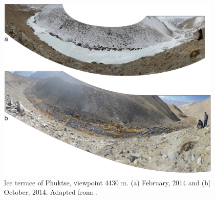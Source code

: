\begin{figure}[htb]
	\centering
	\includegraphics[width=\textwidth]{figs/IT_example.png}
	\caption{Ice terrace of Phuktse, viewpoint 4430 m. (a) February, 2014 and (b) October, 2014. Adapted from:
		\citet{nusserSociohydrologyArtificialGlaciers2019}.}
	\label{fig:ITexample}
\end{figure}

%
%
%
%


